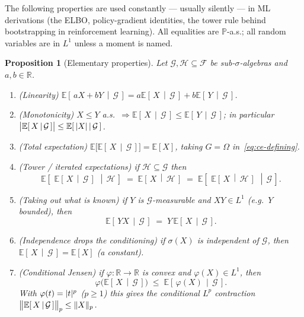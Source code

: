 \documentclass[11pt,oneside]{report}
\theoremstyle{plain}
\newtheorem{proposition}[theorem]{Proposition}
\theoremstyle{definition}
\theoremstyle{remark}
\newcommand{\R}{\mathbb{R}}
\newcommand{\Prob}{\mathbb{P}}
\newcommand{\E}{\mathbb{E}}
\newcommand{\Fcal}{\mathcal{F}}
\newcommand{\Gcal}{\mathcal{G}}
\newcommand{\Hcal}{\mathcal{H}}
\DeclarePairedDelimiter{\abs}{\lvert}{\rvert}
\DeclarePairedDelimiter{\norm}{\lVert}{\rVert}
\newcommand{\cE}[2]{\E\!\left[\,#1 \,\middle|\, #2\,\right]}
\numberwithin{equation}{chapter}
\begin{document}
The following properties are used constantly --- usually silently --- in
ML derivations (the ELBO, policy-gradient identities, the tower rule
behind bootstrapping in reinforcement learning). All equalities are
$\Prob$-a.s.; all random variables are in $L^1$ unless a moment is named.

\begin{proposition}[Elementary properties]\label{prop:ce-props}
Let $\Gcal,\Hcal\subseteq\Fcal$ be sub-$\sigma$-algebras and $a,b\in\R$.
\begin{enumerate}[label=\textup{(\arabic*)},leftmargin=2.4em]
\item \textup{(Linearity)} $\cE{aX+bY}{\Gcal}=a\cE{X}{\Gcal}+b\cE{Y}{\Gcal}$.
\item \textup{(Monotonicity)} $X\le Y$ a.s.\ $\Rightarrow
      \cE{X}{\Gcal}\le\cE{Y}{\Gcal}$; in particular
      $\bigl|\cE{X}{\Gcal}\bigr|\le\cE{\abs{X}}{\Gcal}$.
\item \textup{(Total expectation)} $\E\bigl[\cE{X}{\Gcal}\bigr]=\E[X]$,
      taking $G=\Omega$ in~\eqref{eq:ce-defining}.
\item \textup{(Tower / iterated expectations)} if $\Hcal\subseteq\Gcal$ then
      \begin{equation}\label{eq:tower}
        \cE{\,\cE{X}{\Gcal}\,}{\Hcal}\;=\;\cE{X}{\Hcal}
        \;=\;\cE{\,\cE{X}{\Hcal}\,}{\Gcal}.
      \end{equation}
\item \textup{(Taking out what is known)} if $Y$ is $\Gcal$-measurable and
      $XY\in L^1$ (e.g.\ $Y$ bounded), then
      \begin{equation}\label{eq:take-out}
        \cE{YX}{\Gcal}\;=\;Y\,\cE{X}{\Gcal}.
      \end{equation}
\item \textup{(Independence drops the conditioning)} if $\sigma(X)$ is
      independent of $\Gcal$, then $\cE{X}{\Gcal}=\E[X]$ (a constant).
\item \textup{(Conditional Jensen)} if $\varphi:\R\to\R$ is convex and
      $\varphi(X)\in L^1$, then
      \begin{equation}\label{eq:cond-jensen}
        \varphi\!\bigl(\cE{X}{\Gcal}\bigr)\;\le\;\cE{\varphi(X)}{\Gcal}.
      \end{equation}
      With $\varphi(t)=\abs{t}^p$ ($p\ge1$) this gives the conditional
      $L^p$ contraction $\bigl\|\cE{X}{\Gcal}\bigr\|_p\le\norm{X}_p$.
\end{enumerate}
\end{proposition}
\end{document}
